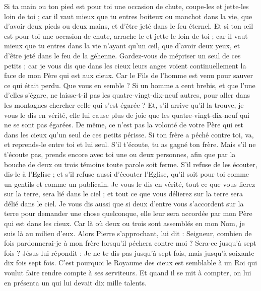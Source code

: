 \begin{multicols}{2}
Si ta main ou ton pied est pour toi une occasion de chute, coupe-les et jette-les loin de toi ; car il vaut mieux que tu entres boiteux ou manchot dans la vie, que d'avoir deux pieds ou deux mains, et d'être jeté dans le feu éternel.
Et si ton œil est pour toi une occasion de chute, arrache-le et jette-le loin de toi ; car il vaut mieux que tu entres dans la vie n'ayant qu'un œil, que d'avoir deux yeux, et d'être jeté dans le feu de la géhenne.
Gardez-vous de mépriser un seul de ces petits ; car je vous dis que dans les cieux leurs anges voient continuellement la face de mon Père qui est aux cieux.
Car le Fils de l'homme est venu pour sauver ce qui était perdu.
Que vous en semble ? Si un homme a cent brebis, et que l’une d’elles s’égare, ne laisse-t-il pas les quatre-vingt-dix-neuf autres, pour aller dans les montagnes chercher celle qui s'est égarée ?
Et, s'il arrive qu'il la trouve, je vous le dis en vérité, elle lui cause plus de joie que les quatre-vingt-dix-neuf qui ne se sont pas égarées.
De même, ce n’est pas la volonté de votre Père qui est dans les cieux qu'un seul de ces petits périsse.
Si ton frère a péché contre toi, va, et reprends-le entre toi et lui seul. S’il t'écoute, tu as gagné ton frère.
Mais s'il ne t'écoute pas, prends encore avec toi une ou deux personnes, afin que par la bouche de deux ou trois témoins toute parole soit ferme{}.
S’il refuse de les écouter, dis-le à l'Eglise ; et s'il refuse aussi d’écouter l'Eglise, qu'il soit pour toi comme un gentils et comme un publicain.
Je vous le dis en vérité, tout ce que vous lierez sur la terre, sera lié dans le ciel ; et tout ce que vous délierez sur la terre sera délié dans le ciel{}.
Je vous dis aussi que si deux d'entre vous s'accordent sur la terre pour demander une chose quelconque, elle leur sera accordée par mon Père qui est dans les cieux.
Car là où deux ou trois sont assemblés en mon Nom, je suis là au milieu d'eux.
Alors Pierre s'approchant, lui dit : Seigneur, combien de fois pardonnerai-je à mon frère lorsqu’il péchera contre moi ? Sera-ce jusqu'à sept fois ?
Jésus lui répondit : Je ne te dis pas jusqu'à sept fois, mais jusqu'à soixante-dix fois sept fois.
C'est pourquoi le Royaume des cieux est semblable à un Roi qui voulut faire rendre compte à ses serviteurs.
Et quand il se mit à compter, on lui en présenta un qui lui devait dix mille talents.

\end{multicols}
